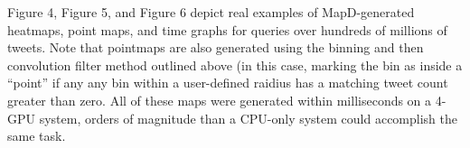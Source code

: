 \documentclass[twocolumn]{article}
\begin{document}
Figure 4, Figure 5, and Figure 6 depict real examples of MapD-generated heatmaps, point maps, and time graphs for queries over hundreds of millions of tweets. Note that pointmaps are also generated using the binning and then convolution filter method outlined above (in this case, marking the bin as inside a “point” if any any bin within a user-defined raidius has a matching tweet count greater than zero. All of these maps were generated within milliseconds on a 4-GPU system, orders of magnitude than a CPU-only system could accomplish the same task.



\end{document}
